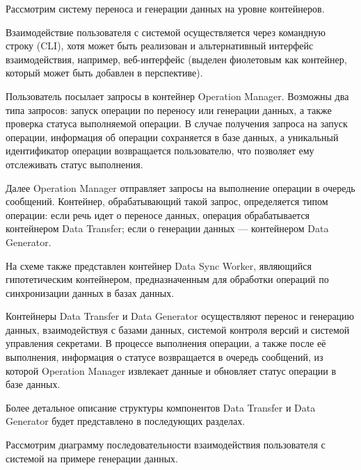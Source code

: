 Рассмотрим систему переноса и генерации данных на уровне контейнеров.

Взаимодействие пользователя с системой осуществляется через командную строку (CLI), хотя может быть реализован и альтернативный интерфейс взаимодействия, например, веб-интерфейс (выделен фиолетовым как контейнер, который может быть добавлен в перспективе).

Пользователь посылает запросы в контейнер Operation Manager. Возможны два типа запросов: запуск операции по переносу или генерации данных, а также проверка статуса выполняемой операции. В случае получения запроса на запуск операции, информация об операции сохраняется в базе данных, а уникальный идентификатор операции возвращается пользователю, что позволяет ему отслеживать статус выполнения.

Далее Operation Manager отправляет запросы на выполнение операции в очередь сообщений. Контейнер, обрабатывающий такой запрос, определяется типом операции: если речь идет о переносе данных, операция обрабатывается контейнером Data Transfer; если о генерации данных — контейнером Data Generator.

На схеме также представлен контейнер Data Sync Worker, являющийся гипотетическим контейнером, предназначенным для обработки операций по синхронизации данных в базах данных.

Контейнеры Data Transfer и Data Generator осуществляют перенос и генерацию данных, взаимодействуя с базами данных, системой контроля версий и системой управления секретами. В процессе выполнения операции, а также после её выполнения, информация о статусе возвращается в очередь сообщений, из которой Operation Manager извлекает данные и обновляет статус операции в базе данных.

Более детальное описание структуры компонентов Data Transfer и Data Generator будет представлено в последующих разделах.

Рассмотрим диаграмму последовательности взаимодействия пользователя с системой на примере генерации данных.

